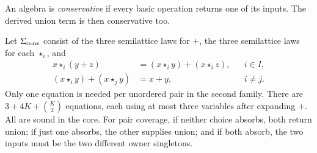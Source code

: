 An algebra is \emph{conservative} if every basic operation returns
one of its inputs. The derived union term is then conservative too.

Let $\Sigma_{\rm cons}$ consist of the three semilattice laws for
$+$, the three semilattice laws for each $\star_i$, and
\begin{align}
 x\star_i(y+z)&=(x\star_i y)+(x\star_i z),
       &&i\in I,\label{core:eq:cons-dist}\\
 (x\star_i y)+(x\star_j y)&=x+y,
       &&i\ne j.\label{core:eq:pair-cover}
\end{align}
Only one equation is needed per unordered pair in the second family.
There are $3+4K+\binom K2$ equations, each using at most three
variables after expanding $+$. All are sound in the core.
For pair coverage, if neither choice absorbs, both return union;
if just one absorbs, the other supplies union; and if both absorb,
the two inputs must be the two different owner singletons.

